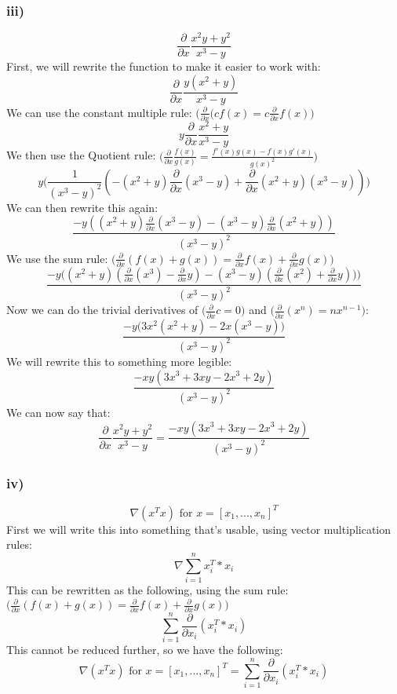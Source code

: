 \subsubsection{iii)}
$$
\frac{\partial}{\partial x}\frac{x^2y+y^2}{x^3-y}
$$
First, we will rewrite the function to make it easier to work with:
$$
\frac{\partial}{\partial x}\frac{y(x^2+y)}{x^3-y}
$$
We can use the constant multiple rule: $\bigg(\frac{\partial}{\partial x}(cf(x) = c\frac{\partial}{\partial x}f(x)\bigg)$
$$
y\frac{\partial}{\partial x}\frac{x^2+y}{x^3-y}
$$
We then use the Quotient rule: $\bigg(\frac{\partial}{\partial x}\frac{f(x)}{g(x)} = \frac{f'(x)g(x)-f(x)g'(x)}{g(x)^2}\bigg)$
$$
y\bigg(\frac{1}{(x^3-y)^2}(-(x^2+y)\frac{\partial}{\partial x}(x^3-y)+\frac{\partial}{\partial x}(x^2+y)(x^3-y))\bigg)
$$
We can then rewrite this again:
$$
\frac{-y((x^2+y)\frac{\partial}{\partial x}(x^3-y)-(x^3-y)\frac{\partial}{\partial x}(x^2+y))}{(x^3-y)^2}
$$
We use the sum rule: $\bigg(\frac{\partial}{\partial x}(f(x)+g(x)) = \frac{\partial}{\partial x}f(x)+\frac{\partial}{\partial x}g(x)\bigg)$
$$
\frac{-y\big((x^2+y)(\frac{\partial}{\partial x}(x^3)-\frac{\partial}{\partial x}y)-(x^3-y)(\frac{\partial}{\partial x}(x^2)+\frac{\partial}{\partial x}y))\big)}{(x^3-y)^2}
$$
Now we can do the trivial derivatives of $\bigg(\frac{\partial}{\partial x}c = 0\bigg)$ and $\bigg(\frac{\partial}{\partial x}(x^n) = nx^{n-1}\bigg)$:
$$
\frac{-y\big(3x^2(x^2+y)-2x(x^3-y)\big)}{(x^3-y)^2}
$$
We will rewrite this to something more legible:
$$
\frac{-xy(3x^3+3xy-2x^3+2y)}{(x^3-y)^2}
$$
We can now say that:
$$
\frac{\partial}{\partial x}\frac{x^2y+y^2}{x^3-y} = \frac{-xy(3x^3+3xy-2x^3+2y)}{(x^3-y)^2}
$$
\subsubsection{iv)}
$$
\nabla(x^Tx) \text{ for } x = [x_1,...,x_n]^T
$$
First we will write this into something that's usable, using vector multiplication rules:
$$
\nabla\sum_{i=1}^n x^T_i*x_i
$$
This can be rewritten as the following, using the sum rule: $\bigg(\frac{\partial}{\partial x}(f(x)+g(x)) = \frac{\partial}{\partial x}f(x)+\frac{\partial}{\partial x}g(x)\bigg)$
$$
\sum_{i=1}^n \frac{\partial}{\partial x_i}(x^T_i*x_i)
$$
This cannot be reduced further, so we have the following:
$$
\nabla(x^Tx) \text{ for } x = [x_1,...,x_n]^T = \sum_{i=1}^n \frac{\partial}{\partial x_i}(x^T_i*x_i)
$$
